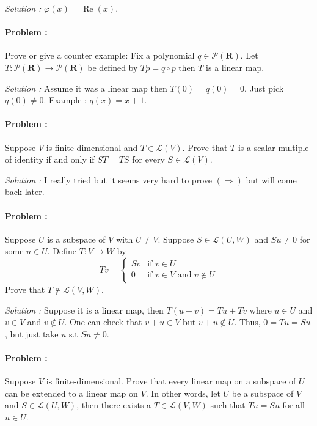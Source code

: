 \vspace{4mm}
\textit{Solution :} $\varphi(x)=\operatorname{Re}(x)$.

\paragraph{Problem :} Prove or give a counter example: Fix a polynomial $q \in \mathcal{P}(\mathbf{R})$. \newline 
Let $T : \mathcal{P}(\mathbf{R}) \to \mathcal{P}(\mathbf{R})$ be defined by $Tp = q \circ p$ then $T$ is a linear map.

\vspace{4mm}
\textit{Solution :}
Assume it was a linear map then $T(0)=q(0)=0$. Just pick $q(0) \neq 0$.
Example : $q(x)=x+1$. 

\paragraph{Problem :} Suppose $V$ is finite-dimensional and $T \in \mathcal{L}(V)$. Prove that $T$ is a scalar multiple
of identity if and only if $ST=TS$ for every $S \in \mathcal{L}(V)$.

\vspace{4mm}
\textit{Solution :} I really tried but it seems very hard to prove $(\Rightarrow)$ but will come back later.

\paragraph{Problem :} Suppose $U$ is a subspace of $V$ with $U \neq V$. Suppose $S \in \mathcal{L}(U,W)$ and $Su \neq 0$ for some $u \in U$.
Define $T : V \to W$ by
\[ Tv = \begin{cases}
    Sv & \text{if } v \in U \\
    0 & \text{if } v \in V \text{ and } v \not \in U
\end{cases} \]
Prove that $T \not \in \mathcal{L}(V,W)$.

\vspace{4mm}
\textit{Solution :} Suppose it is a linear map, then $T(u+v)=Tu + Tv$ where $u \in U$ and $v \in V$ and $v \not \in U$.
One can check that $v+u \in V$ but $v+u \not \in U$. Thus, $0=Tu=Su$, but just take $u$ s.t $Su \neq 0$.

\eject

\paragraph{Problem :} Suppose $V$ is finite-dimensional. Prove that every linear map on a subspace of $U$ can be extended to a linear map 
on $V$. In other words, let $U$ be a subspace of $V$ and  $S \in \mathcal{L}(U,W)$, then there exists a $T \in \mathcal{L}(V,W)$ such that
$Tu = Su$ for all $u \in U$. 


